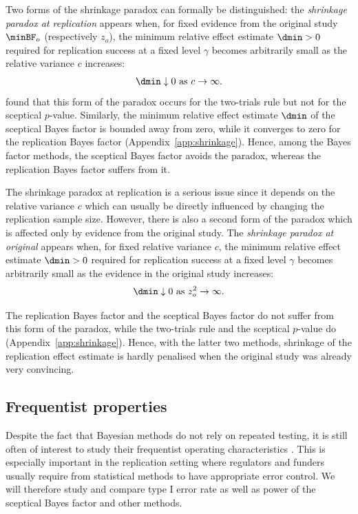 Two forms of the shrinkage paradox can formally be distinguished: the
\emph{shrinkage paradox at replication} appears when, for fixed evidence from
the original study $\minBF_{o}$ (respectively $z_{o}$), the minimum relative
effect estimate $\dmin > 0$ required for replication success at a fixed level
$\gamma$ becomes arbitrarily small as the relative variance $c$ increases:
\begin{align*}
  \dmin \downarrow 0 ~\text{as}~ c \to \infty.
\end{align*}
\citet{Held2021} found that this form of the paradox occurs for the two-trials
rule but not for the sceptical $p$-value. Similarly, the minimum relative effect
estimate $\dmin$ of the sceptical Bayes factor is bounded away from zero, while
it converges to zero for the replication Bayes factor
(Appendix~\ref{app:shrinkage}). Hence, among the Bayes factor methods, the
sceptical Bayes factor avoids the paradox, whereas the replication Bayes factor
suffers from it.

The shrinkage paradox at replication is a serious issue since it depends on the
relative variance $c$ which can usually be directly influenced by changing the
replication sample size. However, there is also a second form of the paradox
which is affected only by evidence from the original study. The \emph{shrinkage
paradox at original} appears when, for fixed relative variance $c$, the minimum
relative effect estimate $\dmin > 0$ required for replication success at a fixed
level $\gamma$ becomes arbitrarily small as the evidence in the original study
increases:
\begin{align*}
  \dmin \downarrow 0 ~\text{as}~ z_{o}^{2} \to \infty.
\end{align*}

The replication Bayes factor and the sceptical Bayes factor do not suffer from
this form of the paradox, while the two-trials rule and the sceptical $p$-value
do (Appendix~\ref{app:shrinkage}). Hence, with the latter two methods, shrinkage
of the replication effect estimate is hardly penalised when the original study
was already very convincing.



\subsection{Frequentist properties}
Despite the fact that Bayesian methods do not rely on repeated testing, it is
still often of interest to study their frequentist operating characteristics
\citep{Dawid1982, Grieve2016}. This is especially important in the replication
setting where regulators and funders usually require from statistical methods to
have appropriate error control. We will therefore study and compare type I error
rate as well as power of the sceptical Bayes factor and other methods.

